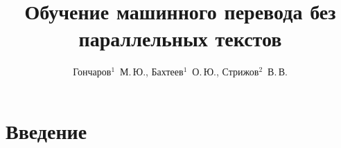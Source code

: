 \documentclass[12pt,twoside]{article}
\title[Обучение машинного перевода без параллельных текстов]{
   Обучение машинного перевода без параллельных текстов
}
\author[Гончаров$^1$~М.\,Ю., Бахтеев$^1$~О.\,Ю., Стрижов$^2$~В.\,В.]{
   Гончаров$^1$~М.\,Ю., Бахтеев$^1$~О.\,Ю., Стрижов$^2$~В.\,В.
}[Гончаров$^1$~М.\,Ю., Бахтеев$^1$~О.\,Ю., Стрижов$^2$~В.\,В.]
\begin{document}
\maketitle

\section{Введение}
\end{document}
